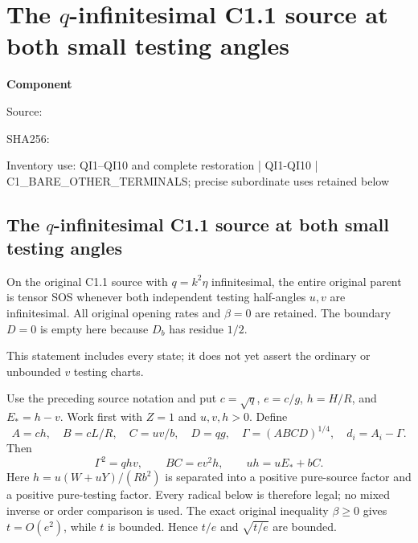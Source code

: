 \chapter{The $q$-infinitesimal C1.1 source at both small testing angles}
\label{component:pc376284fc7ae}
\noindent\textbf{Component }\par
{\small\noindent Source: \par}
{\small\noindent SHA256: \par}
{\small\noindent Inventory use: QI1--QI10 and complete restoration | QI1-QI10 | C1\_\allowbreak{}BARE\_\allowbreak{}OTHER\_\allowbreak{}TERMINALS; precise subordinate uses retained below\par}
\medskip
\section{The $q$-infinitesimal C1.1 source at both small testing angles}
\label{pc376284fc7ae:sec:r7-c1-q-inf-local}
\begin{theorem}
On the original C1.1 source with $q=k^2\eta$ infinitesimal, the entire
original parent is tensor SOS whenever both independent testing
half-angles $u,v$ are infinitesimal. All original opening rates and
$\beta=0$ are retained. The boundary $D=0$ is empty here because
$D_b$ has residue $1/2$.
\end{theorem}
This statement includes every state; it does not yet assert the
ordinary or unbounded $v$ testing charts.

Use the preceding source notation and put $c=\sqrt q$, $e=c/g$,
$h=H/R$, and $E_*=h-v$. Work first with $Z=1$ and $u,v,h>0$.
Define
\[
 A=ch,\quad B=cL/R,\quad C=uv/b,\quad D=qg,\quad
 \Gamma=(ABCD)^{1/4},\quad d_i=A_i-\Gamma.
\]
Then
\[
 \Gamma^2=qhv,\qquad BC=e v^2h,\qquad
 u h=uE_*+bC.
 \tag{QI1}
\]
Here $h=u(W+uY)/(Rb^2)$ is separated into a positive pure-source
factor and a positive pure-testing factor. Every radical below is
therefore legal; no mixed inverse or order comparison is used.
The exact original inequality $\beta\ge0$ gives $t=O(e^2)$, while
$t$ is bounded. Hence $t/e$ and $\sqrt{t/e}$ are bounded.

